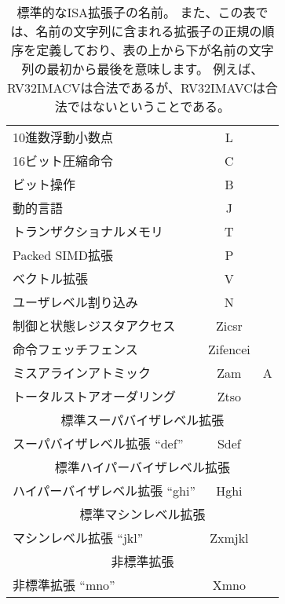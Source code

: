 \begin{table}[h]
\begin{tabular}{|l|c|c|}
10進数浮動小数点 & L & \\
16ビット圧縮命令 & C & \\
ビット操作 & B & \\
動的言語 & J & \\
トランザクショナルメモリ & T & \\
Packed SIMD拡張 & P & \\
ベクトル拡張 & V & \\
ユーザレベル割り込み & N & \\
制御と状態レジスタアクセス & Zicsr & \\
命令フェッチフェンス & Zifencei & \\
ミスアラインアトミック & Zam & A \\
トータルストアオーダリング & Ztso & \\
\hline
\hline
\multicolumn{3}{|c|}{標準スーパバイザレベル拡張}\\
\hline
スーパバイザレベル拡張 ``def'' & Sdef & \\
\hline
\hline
\multicolumn{3}{|c|}{標準ハイパーバイザレベル拡張}\\
\hline
ハイパーバイザレベル拡張 ``ghi'' & Hghi & \\
\hline
\hline
\multicolumn{3}{|c|}{標準マシンレベル拡張}\\
\hline
マシンレベル拡張 ``jkl'' & Zxmjkl & \\
\hline
\hline
\multicolumn{3}{|c|}{非標準拡張}\\
\hline
非標準拡張 ``mno'' & Xmno & \\
\hline
\end{tabular}
\begin{comment}
\caption{Standard ISA extension names.  The table also defines the
  canonical order in which extension names must appear in the name
  string, with top-to-bottom in table indicating first-to-last in the
  name string, e.g., RV32IMACV is legal, whereas RV32IMAVC is not.}
\end{comment}
\caption{標準的なISA拡張子の名前。
  また、この表では、名前の文字列に含まれる拡張子の正規の順序を定義しており、表の上から下が名前の文字列の最初から最後を意味します。
  例えば、RV32IMACVは合法であるが、RV32IMAVCは合法ではないということである。}
\label{isanametable}
\end{table}
